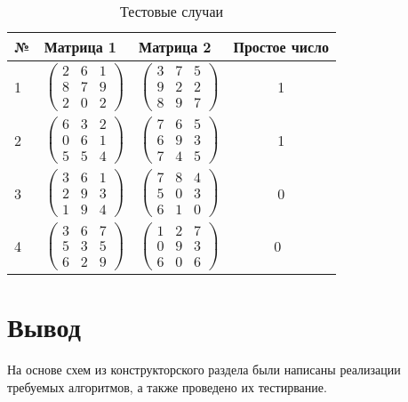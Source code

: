 \begin{table}[H]
	\begin{center}
		\caption{Тестовые случаи}
		\begin{tabular}{l|l|l|c}
			№ & Матрица 1 & Матрица 2 & Простое число\\
			\hline
			1 & $\begin{pmatrix}
			2 & 6 & 1\\ 
			8 & 7 & 9\\
			2 & 0 & 2 
			\end{pmatrix}$ & $\begin{pmatrix}
			3 & 7 & 5\\ 
			9 & 2 & 2\\
			8 & 9 & 7
			\end{pmatrix}$ & 1\\ 
			\hline
			2 & $\begin{pmatrix}
			6 & 3 & 2\\ 
			0 & 6 & 1\\ 
			5 & 5 & 4 
			\end{pmatrix}$ & $\begin{pmatrix}
			7 & 6 & 5\\ 
			6 & 9 & 3\\ 
			7 & 4 & 5 
			\end{pmatrix}$ & 1\\
			\hline
			3 & $\begin{pmatrix}
			3 & 6 & 1\\ 
			2 & 9 & 3\\ 
			1 & 9 & 4  
			\end{pmatrix}$ & $\begin{pmatrix}
			7 & 8 & 4\\ 
			5 & 0 & 3\\ 
			6 & 1 & 0 
			\end{pmatrix}$  & 0\\
			\hline
			4 & $\begin{pmatrix}
			3 & 6 & 7\\ 
			5 & 3 & 5\\ 
			6 & 2 & 9
			\end{pmatrix}$ & $\begin{pmatrix}
			1 & 2 & 7\\ 
			0 & 9 & 3\\ 
			6 & 0 & 6  
			\end{pmatrix}$ & 0\
		\end{tabular}
	\end{center}
\end{table}

\section{Вывод}

На основе схем из конструкторского раздела были написаны реализации требуемых алгоритмов, а также проведено их тестирвание.